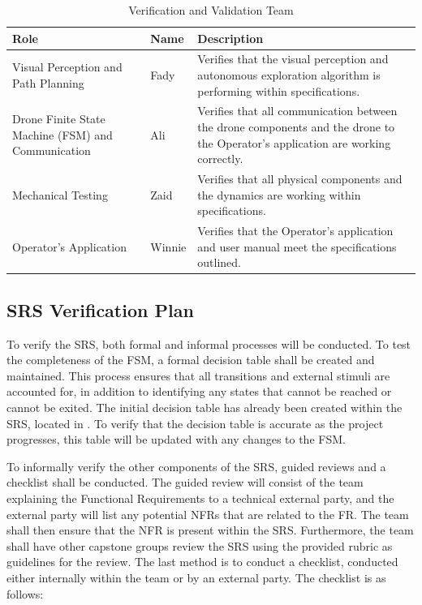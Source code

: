 \documentclass[12pt, titlepage]{article}
\begin{document}
\begin{table}[!h]
\begin{center}
\caption {Verification and Validation Team}
\label{VnV_Team}
\begin{tabular}{ | m{3cm} | m{3cm} | m{8cm} | }
\hline
Role & Name & Description \\
\hline
 Visual Perception and Path Planning & Fady & Verifies that the visual perception and autonomous exploration algorithm is performing within specifications. \\
\hline
Drone Finite State Machine (FSM) and Communication & Ali & Verifies that all communication between the drone components and the drone to the Operator's application are working correctly. \\
\hline
Mechanical Testing & Zaid & Verifies that all physical components and the dynamics are working within specifications. \\
\hline
Operator's Application & Winnie & Verifies that the Operator's application and user manual meet the specifications outlined.
\\
\hline
\end{tabular}
\end{center}
\end{table}

\clearpage

\subsection{SRS Verification Plan}
\label{SRSVerification}

To verify the SRS, both formal and informal processes will be conducted. To test the completeness of the FSM, a formal decision table shall be created and maintained. This process ensures that all transitions and external stimuli are accounted for, in addition to identifying any states that cannot be reached or cannot be exited. The initial decision table has already been created within the SRS, located in . To verify that the decision table is accurate as the project progresses, this table will be updated with any changes to the FSM. 

To informally verify the other components of the SRS, guided reviews and a checklist shall be conducted. The guided review will consist of the team explaining the Functional Requirements to a technical external party, and the external party will list any potential NFRs that are related to the FR. The team shall then ensure that the NFR is present within the SRS. Furthermore, the team shall have other capstone groups review the SRS using the provided rubric as guidelines for the review. The last method is to conduct a checklist, conducted either internally within the team or by an external party. The checklist is as follows: 
\end{document}
